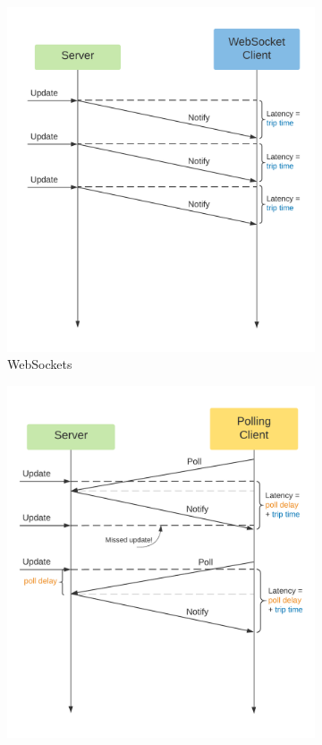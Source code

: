 \documentclass[12pt,a4paper,openright,twoside]{report}
\begin{document}
\begin{figure}[!htb]
\centering
\begin{subfigure}{.5\linewidth}
  \includegraphics[width=1\linewidth]{assets/latency_websockets.png}
  \caption{WebSockets}
  \label{fig:latency_websockets}
\end{subfigure}%
\begin{subfigure}{.5\linewidth}
  \includegraphics[width=1\linewidth]{assets/latency_polling.png}

\end{subfigure}
\end{figure}
\end{document}
